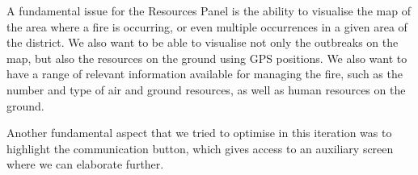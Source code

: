A fundamental issue for the Resources Panel is the ability to visualise the map of the area where a fire is occurring, or even multiple occurrences in a given area of the district. We also want to be able to visualise not only the outbreaks on the map, but also the resources on the ground using GPS positions. We also want to have a range of relevant information available for managing the fire, such as the number and type of air and ground resources, as well as human resources on the ground. \par
Another fundamental aspect that we tried to optimise in this iteration was to highlight the communication button, which gives access to an auxiliary screen where we can elaborate further. \par

